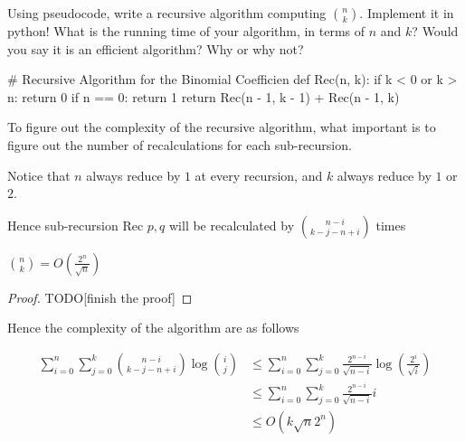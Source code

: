 \documentclass[11pt,a4paper,oneside]{article}
\begin{document}
\begin{problem}{3} 
        Using pseudocode, write a recursive algorithm computing
        ${n \choose k}$. Implement it in python! What is 
        the running time of your algorithm, in terms of $n$ and $k$? Would you say it is an efficient
        algorithm? Why or why not?
    \solution
    \begin{python}
# Recursive Algorithm for the Binomial Coefficien
def Rec(n, k):
    if k < 0 or k > n:
        return 0
    if n == 0:
        return 1
    return Rec(n - 1, k - 1) + Rec(n - 1, k)
    \end{python}

    To figure out the complexity of the recursive algorithm, what important is to figure out the number of recalculations for each sub-recursion.

    Notice that \( n \) always reduce by \( 1 \) at every recursion, and \( k \) always reduce by \( 1 \) or \( 2 \).

    Hence sub-recursion Rec \(p, q\) will be recalculated by \( {n - i \choose k - j - n + i} \) times

    \begin{lemma}
        \({n \choose k} = O(\frac{2^n}{\sqrt{n}})\)
    \begin{proof}
    TODO[finish the proof]
    \end{proof}
    \end{lemma}
    Hence the complexity of the algorithm are as follows

    \[
        \begin{split}
            \sum_{i = 0}^{n} \sum_{j = 0}^k {n - i \choose k - j - n + i} \log{i \choose j} &\leq \sum_{i=0}^{n} \sum_{j=0}^k \frac{2^{n - i}}{\sqrt{n-i}} \log(\frac{2^i}{\sqrt{i}}) \\
            &\leq \sum_{i=0}^{n} \sum_{j=0}^k \frac{2^{n - i}}{\sqrt{n-i}} i \\
            &\leq O(k \sqrt{n}2^n)
        \end{split}
    \]
\end{problem}
\end{document}
